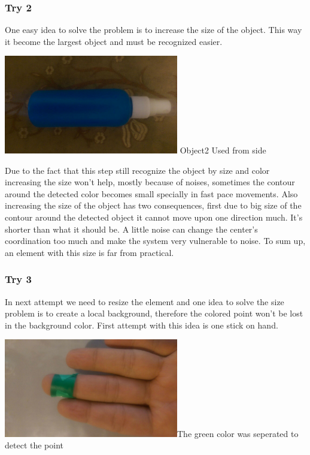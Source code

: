 \documentclass{report}
\begin{document}
\subsubsection{Try 2}
One easy idea to solve the problem is to increase the size of the object. This way it become the largest object and must be recognized easier.
\begin{center}
	\includegraphics[width=3in]{Object2.jpg} \newline \figurename{Object2} Used from side 
\end{center}
Due to the fact that this step still recognize the object by size and color increasing the size won't help, mostly because of noises, sometimes the contour around the detected color becomes small specially in fast pace movements. Also increasing the size of the object has two consequences, first due to big size of the contour around the detected object it cannot move upon one direction much. It's shorter than what it should be. A little noise can change the center's coordination too much and make the system very vulnerable to noise. To sum up, an element with this size is far from practical. 
\subsubsection{Try 3}
In next attempt we need to resize the element and 
one idea to solve the size problem is to create a local background, therefore the colored point won't be lost in the background color. First attempt with this idea is one stick on hand. \newline
\begin{center}
	\includegraphics[width=3in]{Object3.jpg}\newline \figurename{The green color was seperated to detect the point}
\end{center}
\end{document}
